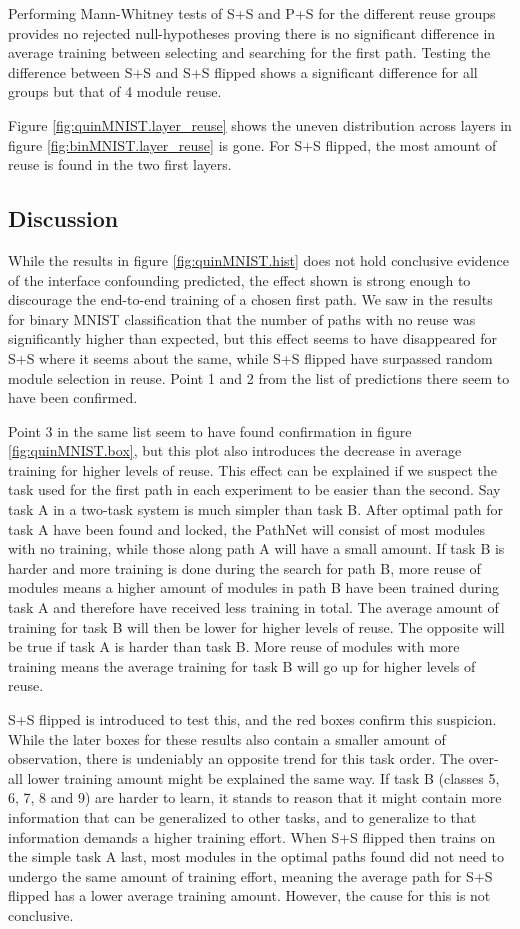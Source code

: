 Performing Mann-Whitney tests of S+S and P+S for the different reuse groups provides no rejected null-hypotheses proving there is no significant difference in average training between selecting and searching for the first path. Testing the difference between S+S and S+S flipped shows a significant difference for all groups but that of 4 module reuse. 

Figure \ref{fig:quinMNIST.layer_reuse} shows the uneven distribution across layers in figure \ref{fig:binMNIST.layer_reuse} is gone. For S+S flipped, the most amount of reuse is found in the two first layers.

\subsection{Discussion}
While the results in figure \ref{fig:quinMNIST.hist} does not hold conclusive evidence of the interface confounding predicted, the effect shown is strong enough to discourage the end-to-end training of a chosen first path. We saw in the results for binary MNIST classification that the number of paths with no reuse was significantly higher than expected, but this effect seems to have disappeared for S+S where it seems about the same, while S+S flipped have surpassed random module selection in reuse. Point 1 and 2 from the list of predictions there seem to have been confirmed. 

Point 3 in the same list seem to have found confirmation in figure \ref{fig:quinMNIST.box}, but this plot also introduces the decrease in average training for higher levels of reuse. This effect can be explained if we suspect the task used for the first path in each experiment to be easier than the second. Say task A in a two-task system is much simpler than task B. After optimal path for task A have been found and locked, the PathNet will consist of most modules with no training, while those along path A will have a small amount. If task B is harder and more training is done during the search for path B, more reuse of modules means a higher amount of modules in path B have been trained during task A and therefore have received less training in total. The average amount of training for task B will then be lower for higher levels of reuse. 
The opposite will be true if task A is harder than task B. More reuse of modules with more training means the average training for task B will go up for higher levels of reuse. 

S+S flipped is introduced to test this, and the red boxes confirm this suspicion. While the later boxes for these results also contain a smaller amount of observation, there is undeniably an opposite trend for this task order. The over-all lower training amount might be explained the same way. If task B (classes 5, 6, 7, 8 and 9) are harder to learn, it stands to reason that it might contain more information that can be generalized to other tasks, and to generalize to that information demands a higher training effort. When S+S flipped then trains on the simple task A last, most modules in the optimal paths found did not need to undergo the same amount of training effort, meaning the average path for S+S flipped has a lower average training amount. However, the cause for this is not conclusive. 

